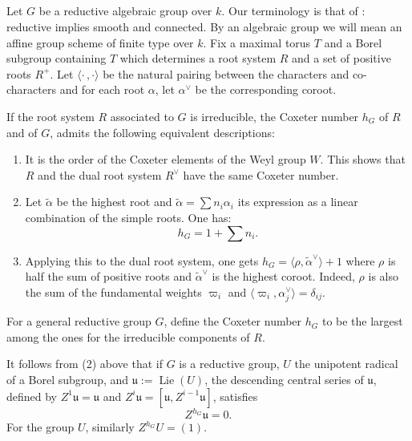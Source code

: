 \documentclass[11pt,a4paper]{article}
\theoremstyle{plain}
\theoremstyle{definition}
\DeclareMathOperator{\Lie}{Lie}
\begin{document}
\subsection{} \label{sec:2.1}
Let $G$ be a reductive algebraic group over $k$. Our terminology is that of \cite{SGA3}: reductive implies smooth and connected. By an algebraic group we will mean an affine group scheme of finite type over $k$. Fix a maximal torus $T$ and a Borel subgroup containing $T$ which determines a root system $R$ and a set of positive roots $R^+$. Let $\langle \cdot\,,\cdot \rangle$ be the natural pairing between the characters and co-characters and for each root $\alpha$, let $\alpha^\vee$ be the corresponding coroot.

If the root system $R$ associated to $G$ is irreducible, the Coxeter number $h_G$ of $R$ and of $G$, admits the following equivalent descriptions:
\begin{enumerate}
\item It is the order of the Coxeter elements of the Weyl group $W$. This shows that $R$ and the dual root system $R^\vee$ have the same Coxeter number.
\item Let $\tilde{\alpha}$ be the highest root and $\tilde{\alpha} = \sum n_i \alpha_i$ its expression as a linear combination of the simple roots. One has:
\begin{equation} \label{eq:2.1.1}
h_G = 1 + \sum n_i.
\end{equation}
\item Applying this to the dual root system, one gets $h_G = \langle \rho, \tilde{\alpha}^\vee \rangle + 1$ where $\rho$ is half the sum of positive roots and $\tilde{\alpha}^\vee$ is the highest coroot. Indeed, $\rho$ is also the sum of the fundamental weights $\varpi_i$ and $\langle \varpi_i, \alpha_j^\vee \rangle = \delta_{ij}$.
\end{enumerate}

For a general reductive group $G$, define the Coxeter number $h_G$ to be the largest among the ones for the irreducible components of $R$.

It follows from (2) above that if $G$ is a reductive group, $U$ the unipotent radical of a Borel subgroup, and $\mathfrak{u} := \Lie(U)$, the descending central series of $\mathfrak{u}$, defined by $Z^1\mathfrak{u} = \mathfrak{u}$ and $Z^i\mathfrak{u} = [\mathfrak{u}, Z^{i-1}\mathfrak{u}]$, satisfies
\begin{equation} \label{eq:2.1.2}
Z^{h_G}\mathfrak{u} = 0.
\end{equation}
For the group $U$, similarly $Z^{h_G}U = (1)$.
\end{document}
